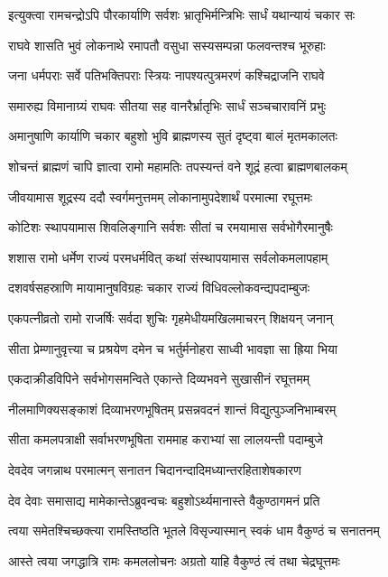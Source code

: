 \twolineshloka
{इत्युक्त्वा रामचन्द्रोऽपि पौरकार्याणि सर्वशः}
{भ्रातृभिर्मन्त्रिभिः सार्धं यथान्यायं चकार सः} %

\twolineshloka
{राघवे शासति भुवं लोकनाथे रमापतौ}
{वसुधा सस्यसम्पन्ना फलवन्तश्च भूरुहाः} %

\twolineshloka
{जना धर्मपराः सर्वे पतिभक्तिपराः स्त्रियः}
{नापश्यत्पुत्रमरणं कश्चिद्राजनि राघवे} %

\twolineshloka
{समारुह्य विमानाग्र्यं राघवः सीतया सह}
{वानरैर्भ्रातृभिः सार्धं सञ्चचारावनिं प्रभुः} %

\twolineshloka
{अमानुषाणि कार्याणि चकार बहुशो भुवि}
{ब्राह्मणस्य सुतं दृष्ट्वा बालं मृतमकालतः} %

\twolineshloka
{शोचन्तं ब्राह्मणं चापि ज्ञात्वा रामो महामतिः}
{तपस्यन्तं वने शूद्रं हत्वा ब्राह्मणबालकम्} %

\twolineshloka
{जीवयामास शूद्रस्य ददौ स्वर्गमनुत्तमम्}
{लोकानामुपदेशार्थं परमात्मा रघूत्तमः} %

\twolineshloka
{कोटिशः स्थापयामास शिवलिङ्गानि सर्वशः}
{सीतां च रमयामास सर्वभोगैरमानुषैः} %

\twolineshloka
{शशास रामो धर्मेण राज्यं परमधर्मवित्}
{कथां संस्थापयामास सर्वलोकमलापहाम्} %

\twolineshloka
{दशवर्षसहस्राणि मायामानुषविग्रहः}
{चकार राज्यं विधिवल्लोकवन्द्यपदाम्बुजः} %

\twolineshloka
{एकपत्नीव्रतो रामो राजर्षिः सर्वदा शुचिः}
{गृहमेधीयमखिलमाचरन् शिक्षयन् जनान्} %

\twolineshloka
{सीता प्रेम्णानुवृत्त्या च प्रश्रयेण दमेन च}
{भर्तुर्मनोहरा साध्वी भावज्ञा सा ह्रिया भिया} %

\twolineshloka
{एकदाक्रीडविपिने सर्वभोगसमन्विते}
{एकान्ते दिव्यभवने सुखासीनं रघूत्तमम्} %

\twolineshloka
{नीलमाणिक्यसङ्काशं दिव्याभरणभूषितम्}
{प्रसन्नवदनं शान्तं विद्युत्पुञ्जनिभाम्बरम्} %

\twolineshloka
{सीता कमलपत्राक्षी सर्वाभरणभूषिता}
{राममाह कराभ्यां सा लालयन्ती पदाम्बुजे} %

\twolineshloka
{देवदेव जगन्नाथ परमात्मन् सनातन}
{चिदानन्दादिमध्यान्तरहिताशेषकारण} %

\twolineshloka
{देव देवाः समासाद्य मामेकान्तेऽब्रुवन्वचः}
{बहुशोऽर्थ्यमानास्ते वैकुण्ठागमनं प्रति} %

\twolineshloka
{त्वया समेतश्चिच्छक्त्या रामस्तिष्ठति भूतले}
{विसृज्यास्मान् स्वकं धाम वैकुण्ठं च सनातनम्} %

\twolineshloka
{आस्ते त्वया जगद्धात्रि रामः कमललोचनः}
{अग्रतो याहि वैकुण्ठं त्वं तथा चेद्रघूत्तमः} %

